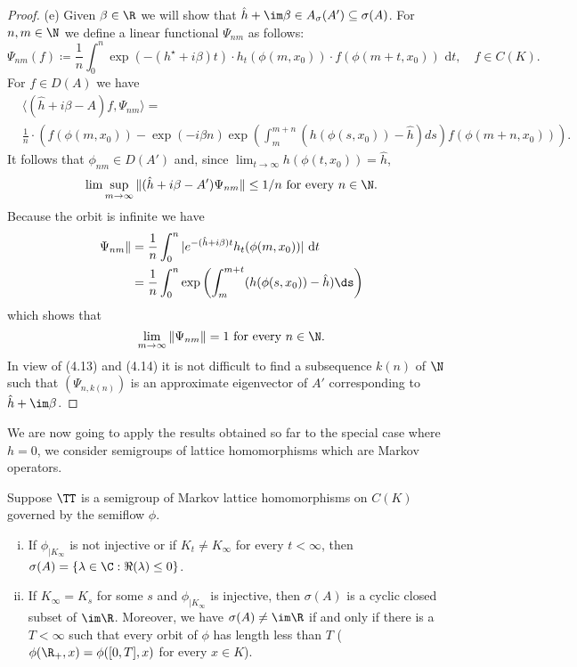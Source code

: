\begin{proof}
(e) Given $\beta \in \R$ we will show that $\hat{h} + \im\beta \in A_{\sigma}(A') \subseteq \sigma(A)$.
For $n,m \in \N$ we define a linear functional $\Psi_{nm}$ as follows:
\[
		\Psi_{nm}(f) \coloneq \frac{1}{n}\int_{0}^{n} \exp(-(h^{\star}+i\beta)t)\cdot h_{t}(\phi(m,x_{0}))\cdot f(\phi(m+t,x_{0})) \text{ d}t, \quad f\in C(K).
\]
For $f \in D(A)$ we have 
\begin{equation*}
	\begin{aligned}
	&\langle(\hat{h}+i\beta-A)f,\Psi_{nm}\rangle = \\
	&\frac{1}{n}\cdot(f(\phi(m,x_{0})) - \exp(-i\beta n)\exp(\int_{m}^{m+n} (h(\phi(s,x_{0}))-\hat{h})ds)f(\phi(m+n,x_{0}))).
	\end{aligned}
\end{equation*}
It follows that $\phi_{nm} \in D(A')$ and, since $\lim_{t\to\infty} h(\phi(t,x_{0})) = \hat{h}$,
\begin{equation}\label{eq:b3-4.13}
	\lim \sup_{m\to\infty} \|(\hat{h}+i\beta-A')\Psi_{nm}\| \leq 1/n \text{ for every } n \in \N.
\end{equation}
Because the orbit is infinite we have
\begin{equation*}
	\begin{aligned}
\Psi_{nm}\| &= \frac{1}{n}\int_{0}^{n} |e^{-(\hat{h}+i\beta)t} h_{t}(\phi(m,x_{0}))| \text{ d}t \\
&= \frac{1}{n}\int_{0}^{n} \exp\left(\int_{m}^{m+t} (h(\phi(s,x_{0}))-\hat{h})\ds\right)
	\end{aligned}
\end{equation*}
which shows that
\begin{equation}\label{eq:b3-4.14}
	\lim_{m\to\infty} \|\Psi_{nm}\| = 1 \text{ for every } n \in \N.
\end{equation}
In view of (4.13) and (4.14) it is not difficult to find a subsequence $k(n)$ of $\N$ such that $(\Psi_{n,k(n)})$ is an approximate eigenvector of $A'$ corresponding to $\hat{h} + \im\beta$.
\end{proof}
We are now going to apply the results obtained so far to the special case where $h = 0$, \ie we consider semigroups of lattice homomorphisms which are Markov operators.
\begin{theorem}\label{thm:b3-4.9}
	Suppose $\TT$ is a semigroup of Markov lattice homomorphisms on $C(K)$ governed by the semiflow $\phi$.
	\begin{enumerate}[(i)]
		\item 
		If $\phi_{|K_{\infty}}$ is not injective or if $K_{t} \neq K_{\infty}$ for every $t < \infty$, then $\sigma(A) = \{\lambda \in \C : \Re(\lambda) \leq 0\}$.
		
		\item 
		If $K_{\infty} = K_{s}$ for some $s$ and $\phi_{|K_{\infty}}$ is injective, then $\sigma(A)$ is a cyclic closed subset of $\im \R$.
		Moreover, we have $\sigma(A) \neq \im\R$ if and only if there is a $T < \infty$ such that every orbit of $\phi$ has length less than $T$ (\ie $\phi(\R_{+},x) = \phi([0,T],x)$ for every $x \in K$).
	\end{enumerate}
\end{theorem}
